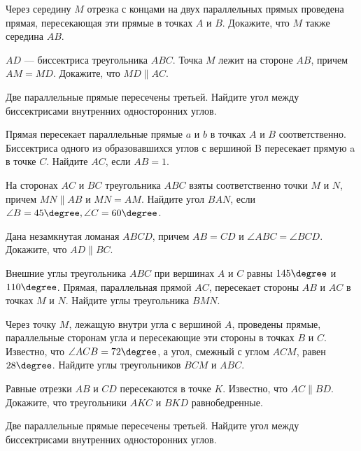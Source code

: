 \begin{class}[number=2]
	\begin{listofex}
		\item Через середину \(M\) отрезка с концами на двух параллельных прямых проведена прямая, пересекающая эти прямые в точках \(A\) и \(B\). Докажите, что \(M\) также середина \(AB\).
		\item \(AD\) --- биссектриса треугольника \(ABC\). Точка \(M\) лежит на стороне \(AB\), причем \(AM = MD\). Докажите, что \(MD \parallel AC\).
		\item Две параллельные прямые пересечены третьей. Найдите угол между биссектрисами внутренних односторонних углов.
		\item Прямая пересекает параллельные прямые \(a\) и \(b\) в точках \(A\) и \(B\) соответственно. Биссектриса одного из образовавшихся углов с вершиной B пересекает прямую a в точке \(C\). Найдите \(AC\), если \(AB = 1\).
		\item На сторонах \(AC\) и \(BC\) треугольника \(ABC\) взяты соответственно точки \(M\) и \(N\), причем \(MN \parallel AB\) и \(MN = AM\). Найдите угол \(BAN\), если \( \angle B = 45 \degree, \angle C = 60 \degree  \).
		\item Дана незамкнутая ломаная \(ABCD\), причем \(AB = CD\) и \(\angle ABC = \angle BCD \). Докажите, что \(AD \parallel BC\).
		
	\end{listofex}
\end{class}

\begin{homework}[number=1]
	\begin{listofex}
		\item Внешние углы треугольника \(ABC\) при вершинах \(A\) и \(C\) равны \(145\degree\) и \(110\degree \). Прямая, параллельная прямой \(AC\), пересекает стороны \(AB\) и \(AC\) в точках \(M\) и \(N\). Найдите углы треугольника \(BMN\).
		\item Через точку \(M\), лежащую внутри угла с вершиной \(A\), проведены прямые, параллельные сторонам угла и пересекающие эти стороны в точках \(B\) и \(C\). Известно, что \(\angle ACB = 72\degree\), а угол, смежный с углом \(ACM\), равен \(28\degree\). Найдите углы треугольников \(BCM\) и \(ABC\).
		\item Равные отрезки \(AB\) и \(CD\) пересекаются в точке \(K\). Известно, что \(AC \parallel BD \). Докажите, что треугольники \(AKC\) и \(BKD\) равнобедренные.
		\item Две параллельные прямые пересечены третьей. Найдите угол между биссектрисами внутренних односторонних углов.
	\end{listofex}
\end{homework}

